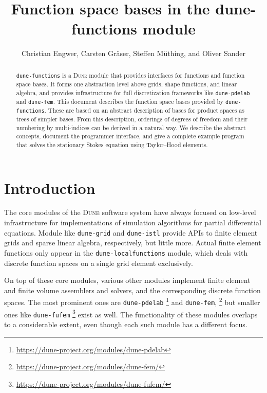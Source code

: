 \documentclass[a4paper,10pt,headings=normal,bibliography=totoc]{scrartcl}
\title{Function space bases in the dune-functions module}
\author{Christian Engwer, Carsten Gräser, Steffen Müthing, and Oliver Sander}
\newcommand{\dune}{\textsc{Dune}\xspace}
\newcommand{\dunemodule}[1]{\texttt{#1}}
\begin{document}
\maketitle

\begin{abstract}
 \dunemodule{dune-functions} is a \dune module that provides interfaces for functions and function space bases.
 It forms one abstraction level above grids, shape functions, and linear algebra, and provides infrastructure
 for full discretization frameworks like \dunemodule{dune-pdelab} and \dunemodule{dune-fem}.
 This document describes the function space bases provided by \dunemodule{dune-functions}.  These are
 based on an abstract description of bases for product spaces as trees of simpler bases.
 From this description, orderings of degrees of freedom and their numbering by multi-indices can be
 derived in a natural way. We describe the abstract concepts, document the programmer interface,
 and give a complete example program that solves the stationary Stokes equation using Taylor--Hood elements.
\end{abstract}

\section*{Introduction}

The core modules of the \dune software system have always focused on low-level infrastructure for
implementations of simulation algorithms for partial differential equations.  Module like
\dunemodule{dune-grid} and \dunemodule{dune-istl} provide APIs to finite  element grids
and sparse linear algebra, respectively, but little more. Actual finite element functions only
appear in the \dunemodule{dune-localfunctions} module, which deals with discrete function spaces
on a single grid element exclusively.

On top of these core modules, various other modules implement finite element and finite volume assemblers
and solvers, and the corresponding discrete function spaces. The most prominent ones are
\dunemodule{dune-pdelab}%
\footnote{\url{https://dune-project.org/modules/dune-pdelab}}
%
and \dunemodule{dune-fem},%
\footnote{\url{https://dune-project.org/modules/dune-fem/}}
%
but smaller ones like \dunemodule{dune-fufem}%
\footnote{\url{https://dune-project.org/modules/dune-fufem/}}
%
exist as well.  The functionality of these modules overlaps to a considerable extent, even though
each such module has a different focus.
\end{document}

